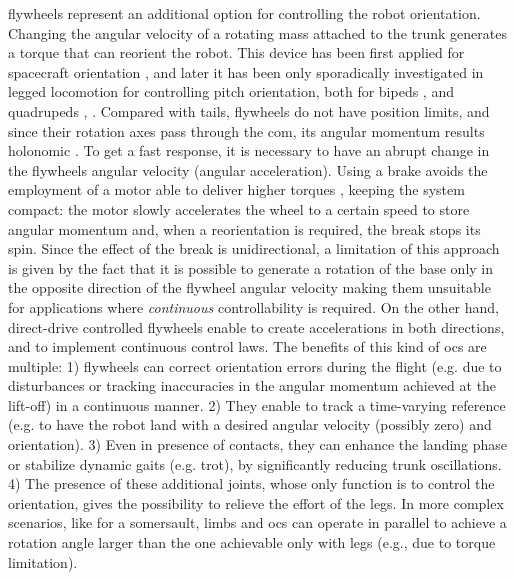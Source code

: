 \documentclass[letterpaper, 10 pt, conference]{ieeeconf}      %
\begin{document}
flywheels represent an additional option for controlling the robot orientation.
Changing the angular velocity of a rotating mass attached to the trunk generates a torque that can reorient the robot. This device has been first applied for spacecraft orientation \cite{oland2009reaction}, and later it has been only sporadically investigated in legged locomotion for controlling pitch orientation, both for bipeds \cite{Brown2016}, \cite{xiong2020sequential} and quadrupeds \cite{kolvenbach2019towards}, \cite{vasilopoulos2016quadruped}.
Compared with tails, flywheels do not have position limits, and since their rotation axes pass through the \gls{com}, its angular momentum results holonomic \cite{machairas2015quadruped}.
To get a fast response, it is necessary to have an abrupt change in the flywheels angular velocity (angular acceleration).
Using a brake avoids the employment of a motor able to deliver higher torques \cite{gajamohan2012cubli}, 
keeping the system compact: the motor slowly accelerates the wheel to a certain speed to store angular momentum and, when a reorientation is required, the break stops its spin.
Since the effect of the break is unidirectional, a limitation of this approach is given by the fact that it is possible to generate a rotation of the base only in the opposite direction of the flywheel angular velocity making them unsuitable for applications where \textit{continuous} controllability is required. On the other hand, direct-drive controlled flywheels enable to create accelerations in both directions,  and  to implement continuous control laws. The benefits of this kind of  \gls{ocs} are multiple: 1) flywheels can correct orientation errors during the flight (e.g. due to disturbances or tracking inaccuracies in the angular momentum achieved at the lift-off)   %
in a continuous manner. 2) They enable to track a time-varying reference (e.g. to have the robot land with a desired angular velocity (possibly zero) and orientation).
3) Even in presence of contacts, they can enhance the landing phase or stabilize dynamic gaits (e.g. trot), by significantly reducing trunk oscillations.  
4) The presence of these additional joints, whose only function is to control the orientation, gives the possibility to relieve the effort of the legs.
In more complex scenarios, like for a somersault, limbs and \gls{ocs} can operate in parallel to achieve a rotation angle larger than the one achievable only with legs (e.g., due to torque limitation). 
\end{document}
